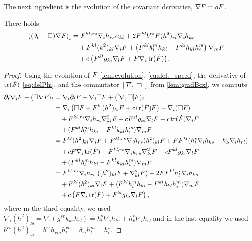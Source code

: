 \documentclass{amsart}
\begin{document}
The next ingredient is the evolution of the covariant derivative, \(\nabla F = dF\).
\begin{lemma}
\label{lem:Evgradphi}
There holds
\[
\begin{split}
\left((\partial_{t}-\Box)\nabla F\right)_{i} &= F^{kl,rs}\nabla_i h_{rs} \alpha_{kl} + 2 F^{kl} b^{rs} F(h^2)_{rl} \nabla_i h_{ks} \\
&\quad + F^{kl}(h^2)_{kl}\nabla_i F + \left(F^{kl}h^{m}_{l}h_{ki} - F^{kl}h_{kl}h^{m}_{i}\right) \nabla_m F\\
&\quad + c\left(F^{kl}g_{ki} \nabla_l F + F \nabla_i \operatorname{tr}(\dot{F})\right).
\end{split}
\]
\end{lemma}
\begin{proof}
Using the evolution of \(F\) \cref{lem:evolution}, \cref{eq:delt_speed}, the derivative of \(\operatorname{tr}(\dot{F})\) \cref{eq:delPhi}, and the commutator \([\nabla, \Box]\) from \cref{lem:gradBox}, we compute
\[
\begin{split}
\partial_{t}\nabla_i F - (\Box\nabla F)_{i} &= \nabla_i \partial_t F - \nabla_i \Box F + ([\nabla, \Box] F)_i \\
&= \nabla_i \left(\Box F + F^{kl}(h^2)_{kl}F + c \operatorname{tr}(\dot{F})F\right) - \nabla_i (\Box F) \\
&\quad + F^{kl,rs} \nabla_i h_{rs} \nabla^2_{kl} F + cF^{kl}g_{ki} \nabla_l F - c\operatorname{tr}(\dot{F})\nabla_i F \\
&\quad + (F^{kl}h^{m}_{l}h_{ki} - F^{kl}h_{kl}h^{m}_{i}) \nabla_m F \\
&= F^{kl}(h^2)_{kl}\nabla_i F + F^{kl,rs}\nabla_i h_{rs} (h^2)_{kl}F + FF^{kl}(h^s_l \nabla_i h_{ks} + h^r_k \nabla_i h_{rl})\\&\quad  + c F\nabla_i\operatorname{tr}(\dot{F})
+ F^{kl,rs} \nabla_i h_{rs} \nabla^2_{kl} F + cF^{kl}g_{ki}\nabla_l F \\
&\quad + (F^{kl}h^{m}_{l}h_{ki} - F^{kl}h_{kl}h^{m}_{i}) \nabla_m F \\
&= F^{kl,rs}\nabla_i h_{rs} \left((h^2)_{kl}F + \nabla^2_{kl} F\right) + 2 FF^{kl} h^s_l \nabla_i h_{ks} \\
&\quad + F^{kl}(h^2)_{kl}\nabla_i F + (F^{kl}h^{m}_{l}h_{ki} - F^{kl}h_{kl}h^{m}_{i}) \nabla_m F \\
&\quad + c \left(F\nabla_i\operatorname{tr}(\dot{F}) + F^{kl}g_{ki}\nabla_l F\right),
\end{split}
\]
where in the third equality, we used
$
\nabla_i (h^2)_{kl} = \nabla_i (g^{sr} h_{ks} h_{rl}) = h^s_l \nabla_i h_{ks} + h^r_k \nabla_i h_{rl}
$
and in the last equality we used
$
b^{rs} (h^2)_{rl} = b^{rs} h_{rm} h^m_l = \delta^s_m h^m_l = h^s_l.
$
\end{proof}
\end{document}
